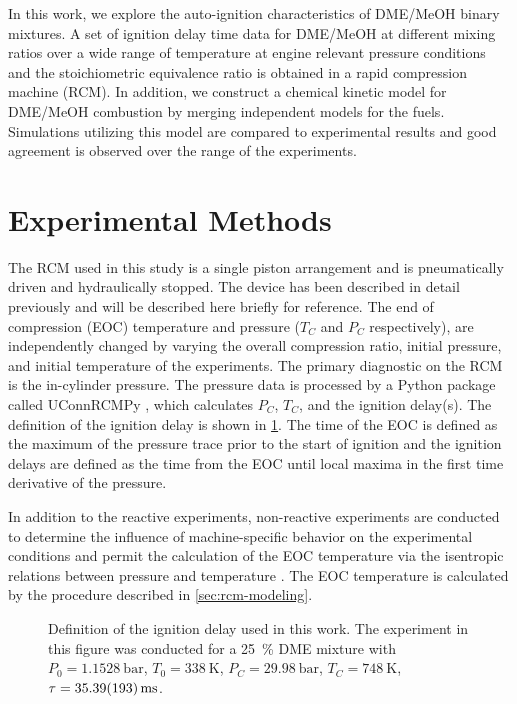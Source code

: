 \documentclass[12pt]{../ussci}
\begin{document}
In this work, we explore the auto-ignition characteristics of DME/MeOH binary
mixtures. A set of ignition delay time data for DME/MeOH at different mixing
ratios over a wide range of temperature at engine relevant pressure conditions
and the stoichiometric equivalence ratio is obtained in a rapid compression
machine (RCM). In addition, we construct a chemical kinetic model for DME/MeOH
combustion by merging independent models for the fuels. Simulations utilizing
this model are compared to experimental results and good agreement is observed
over the range of the experiments.

\section{Experimental Methods}\label{sec:experimental-methods}

The RCM used in this study is a single piston arrangement and is pneumatically
driven and hydraulically stopped. The device has been described in detail
previously \autocite{Mittal2007a} and will be described here briefly for
reference. The end of compression (EOC) temperature and pressure (\(T_C\) and
\(P_C\) respectively), are independently changed by varying the overall
compression ratio, initial pressure, and initial temperature of the experiments.
The primary diagnostic on the RCM is the in-cylinder pressure. The pressure data
is processed by a Python package called UConnRCMPy \autocite{uconnrcmpy}, which
calculates \(P_C\), \(T_C\), and the ignition delay(s). The definition of the
ignition delay is shown in \cref{fig:ign-delay-def}. The time of the EOC is
defined as the maximum of the pressure trace prior to the start of ignition and
the ignition delays are defined as the time from the EOC until local maxima in
the first time derivative of the pressure.

In addition to the reactive experiments, non-reactive experiments are conducted
to determine the influence of machine-specific behavior on the experimental
conditions and permit the calculation of the EOC temperature via the isentropic
relations between pressure and temperature \autocite{Lee1998}. The EOC
temperature is calculated by the procedure described in
\cref{sec:rcm-modeling}.

\begin{figure}[htb]
    \centering
    \resizebox{0.6\textwidth}{!}{}
    \caption{Definition of the ignition delay used in this work. The
    experiment in this figure was conducted for a \SI{25}{\percent} DME mixture with \(P_0=\SI{1.1528}{\bar}\), \(T_0=\SI{338}{\K}\),
    \(P_C=\SI{29.98}{\bar}\), \(T_C=\SI{748}{\K}\),
    \(\tau=\SI{35.39\pm1.93}{\ms}\).}
    \label{fig:ign-delay-def}
\end{figure}
\end{document}

